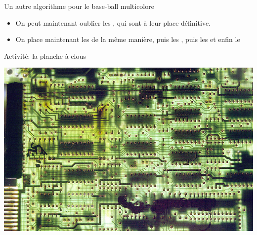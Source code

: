 \documentclass[final,hyperref={pdfpagelabels=false}]{beamer}
\begin{document}
\begin{frame}{Un autre algorithme pour le base-ball multicolore}
  \begin{itemize}
  \item On peut maintenant oublier les , qui sont à leur place définitive.
  \item On place maintenant les  de la même manière, puis les ,
    puis les  et enfin le 
  \end{itemize}
\end{frame}

\begin{frame}{Activité: la planche à clous}
  
  \centerline{\includegraphics[width=.7\linewidth]{img/electric_city.jpg}\label{img:electric:city}}
\end{frame}
\end{document}
